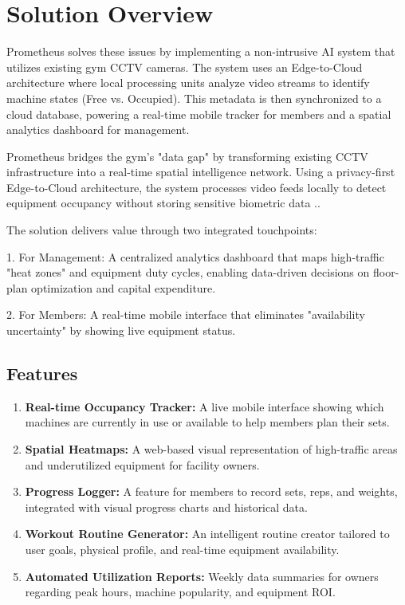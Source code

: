 \section{Solution Overview}
\label{section:solution-overview}

Prometheus solves these issues by implementing a non-intrusive AI system that utilizes existing 
gym CCTV cameras. The system uses an Edge-to-Cloud architecture where local processing units 
analyze video streams to identify machine states (Free vs. Occupied). This metadata is then 
synchronized to a cloud database, powering a real-time mobile tracker for members and a spatial 
analytics dashboard for management.

Prometheus bridges the gym’s "data gap" by transforming existing CCTV infrastructure into a real-time 
spatial intelligence network. Using a privacy-first Edge-to-Cloud architecture, the system processes 
video feeds locally to detect equipment occupancy without storing sensitive biometric data \cite{thailand:pdpa}..

The solution delivers value through two integrated touchpoints:

1. For Management: A centralized analytics dashboard that maps high-traffic "heat zones" and equipment 
duty cycles, enabling data-driven decisions on floor-plan optimization and capital expenditure.

2. For Members: A real-time mobile interface that eliminates "availability uncertainty" by showing 
live equipment status.

\subsection{Features}
\label{subsection:features}

\begin{enumerate}[leftmargin=90pt]
    \item \textbf{Real-time Occupancy Tracker:} A live mobile interface showing which machines are currently in use or available to help members plan their sets.
    \item \textbf{Spatial Heatmaps:} A web-based visual representation of high-traffic areas and underutilized equipment for facility owners.
    \item \textbf{Progress Logger:} A feature for members to record sets, reps, and weights, integrated with visual progress charts and historical data.
    \item \textbf{Workout Routine Generator:} An intelligent routine creator tailored to user goals, physical profile, and real-time equipment availability.
    \item \textbf{Automated Utilization Reports:} Weekly data summaries for owners regarding peak hours, machine popularity, and equipment ROI.
\end{enumerate}

